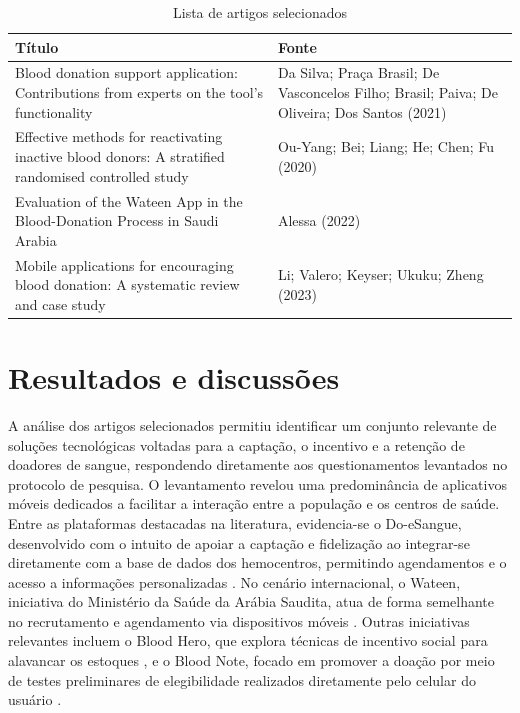 \begin{table}[H]
  \centering
  \caption{Lista de artigos selecionados}
  \label{tab:artigos}
  \begin{tabularx}{\textwidth}{>{\raggedright\arraybackslash}X >{\raggedright\arraybackslash}p{5.2cm}}
    \toprule
    \textbf{Título} & \textbf{Fonte} \\
    \midrule
    Blood donation support application: Contributions from experts on the tool's functionality
    & Da Silva; Praça Brasil; De Vasconcelos Filho; Brasil; Paiva; De Oliveira; Dos Santos (2021) \\
    \addlinespace
    Effective methods for reactivating inactive blood donors: A stratified randomised controlled study
    & Ou-Yang; Bei; Liang; He; Chen; Fu (2020) \\
    \addlinespace
    Evaluation of the Wateen App in the Blood-Donation Process in Saudi Arabia
    & Alessa (2022) \\
    \addlinespace
    Mobile applications for encouraging blood donation: A systematic review and case study
    & Li; Valero; Keyser; Ukuku; Zheng (2023) \\
    \bottomrule
  \end{tabularx}
\end{table}

\section{Resultados e discussões}

A análise dos artigos selecionados permitiu identificar um conjunto relevante de soluções tecnológicas voltadas para a captação, o incentivo e a retenção de doadores de sangue, respondendo diretamente aos questionamentos levantados no protocolo de pesquisa. O levantamento revelou uma predominância de aplicativos móveis dedicados a facilitar a interação entre a população e os centros de saúde. Entre as plataformas destacadas na literatura, evidencia-se o Do-eSangue, desenvolvido com o intuito de apoiar a captação e fidelização ao integrar-se diretamente com a base de dados dos hemocentros, permitindo agendamentos e o acesso a informações personalizadas \cite{dasilva2021}. No cenário internacional, o Wateen, iniciativa do Ministério da Saúde da Arábia Saudita, atua de forma semelhante no recrutamento e agendamento via dispositivos móveis \cite{alessa2022}. Outras iniciativas relevantes incluem o Blood Hero, que explora técnicas de incentivo social para alavancar os estoques \cite{li2023}, e o Blood Note, focado em promover a doação por meio de testes preliminares de elegibilidade realizados diretamente pelo celular do usuário \cite{li2023}.

